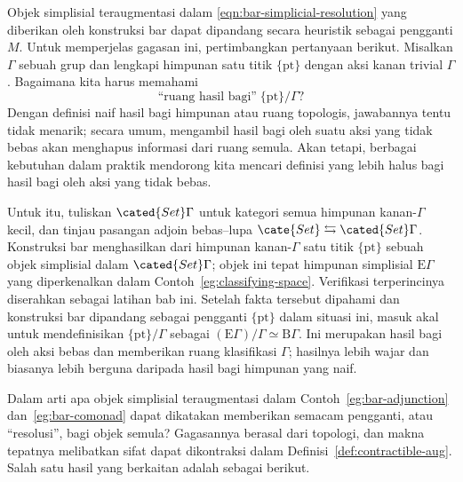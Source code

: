 
Objek simplisial teraugmentasi dalam
\eqref{eqn:bar-simplicial-resolution} yang diberikan oleh konstruksi bar
dapat dipandang secara heuristik sebagai pengganti $M$. Untuk
memperjelas gagasan ini, pertimbangkan pertanyaan berikut. Misalkan
$\Gamma$ sebuah grup dan lengkapi himpunan satu titik $\{\mathrm{pt}\}$
dengan aksi kanan trivial $\Gamma$. Bagaimana kita harus memahami
\[ \text{``ruang hasil bagi''}\; \{\mathrm{pt}\} / \Gamma ? \]
Dengan definisi naif hasil bagi himpunan atau ruang topologis, jawabannya
tentu tidak menarik; secara umum, mengambil hasil bagi oleh suatu aksi
yang tidak bebas akan menghapus informasi dari ruang semula. Akan tetapi,
berbagai kebutuhan dalam praktik mendorong kita mencari definisi yang
lebih halus bagi hasil bagi oleh aksi yang tidak bebas.

Untuk itu, tuliskan $\cated{Set}\Gamma$ untuk kategori semua himpunan
kanan-$\Gamma$ kecil, dan tinjau pasangan adjoin bebas--lupa
$\cate{Set}\leftrightarrows\cated{Set}\Gamma$. Konstruksi bar menghasilkan
dari himpunan kanan-$\Gamma$ satu titik $\{\mathrm{pt}\}$ sebuah objek
simplisial dalam $\cated{Set}\Gamma$; objek ini tepat himpunan simplisial
$\mathrm{E}\Gamma$ yang diperkenalkan dalam
Contoh~\ref{eg:classifying-space}. Verifikasi terperincinya diserahkan
sebagai latihan bab ini. Setelah fakta tersebut dipahami dan konstruksi bar
dipandang sebagai pengganti $\{\mathrm{pt}\}$ dalam situasi ini,
masuk akal untuk mendefinisikan $\{\mathrm{pt}\}/\Gamma$ sebagai
$(\mathrm{E}\Gamma)/\Gamma\simeq\mathrm{B}\Gamma$. Ini merupakan hasil
bagi oleh aksi bebas dan memberikan ruang klasifikasi $\Gamma$;
hasilnya lebih wajar dan biasanya lebih berguna daripada hasil bagi
himpunan yang naif.

Dalam arti apa objek simplisial teraugmentasi dalam
Contoh~\ref{eg:bar-adjunction} dan~\ref{eg:bar-comonad} dapat dikatakan
memberikan semacam pengganti, atau ``resolusi'', bagi objek semula?
Gagasannya berasal dari topologi, dan makna tepatnya melibatkan sifat
dapat dikontraksi dalam Definisi~\ref{def:contractible-aug}. Salah satu
hasil yang berkaitan adalah sebagai berikut.

